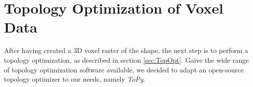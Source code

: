 \section{Topology Optimization of Voxel Data}
\label{sec:ToPy}
After having created a 3D voxel raster of the shape, the next step is to perform a topology optimization, as described in section \ref{sec:TopOpt}. 
Gaive the wide range of topology optimization software available, we decided to adapt an open-source topology optimizer to our needs, namely \emph{ToPy}.







